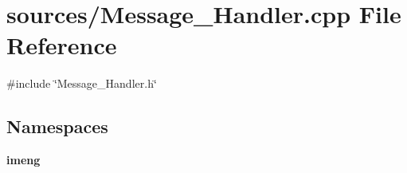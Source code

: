 \section{sources/\+Message\+\_\+\+Handler.cpp File Reference}
\label{_message___handler_8cpp}
{\ttfamily \#include \char`\"{}Message\+\_\+\+Handler.\+h\char`\"{}}\newline
\subsection*{Namespaces}
\begin{DoxyCompactItemize}
\item 
 \textbf{ imeng}
\end{DoxyCompactItemize}
